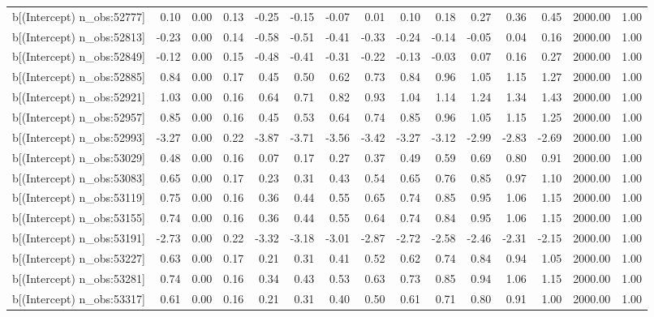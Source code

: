 \begin{table}[ht]
\begin{tabular}{rrrrrrrrrrrrrrr}
  b[(Intercept) n\_obs:52777] & 0.10 & 0.00 & 0.13 & -0.25 & -0.15 & -0.07 & 0.01 & 0.10 & 0.18 & 0.27 & 0.36 & 0.45 & 2000.00 & 1.00 \\ 
  b[(Intercept) n\_obs:52813] & -0.23 & 0.00 & 0.14 & -0.58 & -0.51 & -0.41 & -0.33 & -0.24 & -0.14 & -0.05 & 0.04 & 0.16 & 2000.00 & 1.00 \\ 
  b[(Intercept) n\_obs:52849] & -0.12 & 0.00 & 0.15 & -0.48 & -0.41 & -0.31 & -0.22 & -0.13 & -0.03 & 0.07 & 0.16 & 0.27 & 2000.00 & 1.00 \\ 
  b[(Intercept) n\_obs:52885] & 0.84 & 0.00 & 0.17 & 0.45 & 0.50 & 0.62 & 0.73 & 0.84 & 0.96 & 1.05 & 1.15 & 1.27 & 2000.00 & 1.00 \\ 
  b[(Intercept) n\_obs:52921] & 1.03 & 0.00 & 0.16 & 0.64 & 0.71 & 0.82 & 0.93 & 1.04 & 1.14 & 1.24 & 1.34 & 1.43 & 2000.00 & 1.00 \\ 
  b[(Intercept) n\_obs:52957] & 0.85 & 0.00 & 0.16 & 0.45 & 0.53 & 0.64 & 0.74 & 0.85 & 0.96 & 1.05 & 1.15 & 1.25 & 2000.00 & 1.00 \\ 
  b[(Intercept) n\_obs:52993] & -3.27 & 0.00 & 0.22 & -3.87 & -3.71 & -3.56 & -3.42 & -3.27 & -3.12 & -2.99 & -2.83 & -2.69 & 2000.00 & 1.00 \\ 
  b[(Intercept) n\_obs:53029] & 0.48 & 0.00 & 0.16 & 0.07 & 0.17 & 0.27 & 0.37 & 0.49 & 0.59 & 0.69 & 0.80 & 0.91 & 2000.00 & 1.00 \\ 
  b[(Intercept) n\_obs:53083] & 0.65 & 0.00 & 0.17 & 0.23 & 0.31 & 0.43 & 0.54 & 0.65 & 0.76 & 0.85 & 0.97 & 1.10 & 2000.00 & 1.00 \\ 
  b[(Intercept) n\_obs:53119] & 0.75 & 0.00 & 0.16 & 0.36 & 0.44 & 0.55 & 0.65 & 0.74 & 0.85 & 0.95 & 1.06 & 1.15 & 2000.00 & 1.00 \\ 
  b[(Intercept) n\_obs:53155] & 0.74 & 0.00 & 0.16 & 0.36 & 0.44 & 0.55 & 0.64 & 0.74 & 0.84 & 0.95 & 1.06 & 1.15 & 2000.00 & 1.00 \\ 
  b[(Intercept) n\_obs:53191] & -2.73 & 0.00 & 0.22 & -3.32 & -3.18 & -3.01 & -2.87 & -2.72 & -2.58 & -2.46 & -2.31 & -2.15 & 2000.00 & 1.00 \\ 
  b[(Intercept) n\_obs:53227] & 0.63 & 0.00 & 0.17 & 0.21 & 0.31 & 0.41 & 0.52 & 0.62 & 0.74 & 0.84 & 0.94 & 1.05 & 2000.00 & 1.00 \\ 
  b[(Intercept) n\_obs:53281] & 0.74 & 0.00 & 0.16 & 0.34 & 0.43 & 0.53 & 0.63 & 0.73 & 0.85 & 0.94 & 1.06 & 1.15 & 2000.00 & 1.00 \\ 
  b[(Intercept) n\_obs:53317] & 0.61 & 0.00 & 0.16 & 0.21 & 0.31 & 0.40 & 0.50 & 0.61 & 0.71 & 0.80 & 0.91 & 1.00 & 2000.00 & 1.00 \\ 

\end{tabular}
\end{table}
